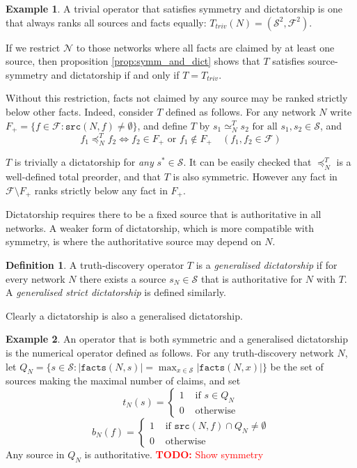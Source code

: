 \documentclass{article}
\theoremstyle{definition} \newtheorem{definition}{Definition}
\theoremstyle{definition} \newtheorem{example}{Example}
\theoremstyle{plain} \newtheorem{axiom}{Axiom}
\theoremstyle{plain} \newtheorem*{remark}{Remark}
\theoremstyle{remark} \newtheorem*{notation}{Notation}
\theoremstyle{plain} \newtheorem{lemma}{Lemma}
\theoremstyle{plain} \newtheorem{theorem}{Theorem}
\theoremstyle{plain} \newtheorem{proposition}{Proposition}
\newcommand{\todo}[1] {
    \textcolor{red}{
        \textbf{TODO:} #1
    }
}
\renewcommand{\S}{\mathcal{S}}  %
\newcommand{\F}{\mathcal{F}}
\newcommand{\N}{\mathcal{N}}
\newcommand{\seq}{\simeq}
\newcommand{\fle}{\preceq}
\newcommand{\src}{\texttt{src}}
\newcommand{\fact}{\texttt{facts}}
\begin{document}
\begin{example}
A trivial operator that satisfies symmetry and dictatorship is one that always
ranks all sources and facts equally: $T_{triv}(N) = (\S^2, \F^2)$.

If we restrict $\N$ to those networks where all facts are claimed by
at least one source, then proposition \ref{prop:symm_and_dict} shows that $T$
satisfies source-symmetry and dictatorship if and only if $T=T_{triv}$.

Without this restriction, facts not claimed by any source may be ranked
strictly below other facts. Indeed, consider $T$ defined as follows. For any
network $N$ write $F_{+} = \{f \in \F : \src(N, f) \ne \emptyset \}$, and
define $T$ by $s_1 \seq_N^{T} s_2 \text{ for all } s_1, s_2 \in \S$, and
$$
    f_1 \fle_N^{T} f_2 \iff f_2 \in F_{+} \text{ or } f_1 \notin F_{+}
    \quad
    (f_1, f_2 \in \F)
$$

$T$ is trivially a dictatorship for \emph{any} $s^* \in \S$. It can be easily
checked that $\fle_N^T$ is a well-defined total preorder, and that $T$ is also
symmetric. However any fact in $\F \setminus F_+$ ranks strictly below any fact
in $F_+$.
\end{example}

Dictatorship requires there to be a fixed source that is authoritative
in all networks. A weaker form of dictatorship, which is more compatible with
symmetry, is where the authoritative source may depend on $N$.

\begin{definition}
\label{def:gen_dict}
A truth-discovery operator $T$ is a \emph{generalised dictatorship} if for
every network $N$ there exists a source $s_N \in \S$ that is authoritative for
$N$ with $T$. A \emph{generalised strict dictatorship} is defined similarly.
\end{definition}

Clearly a dictatorship is also a generalised dictatorship.

\begin{example}
\label{example:symm_and_gen_dict}
An operator that is both symmetric and a generalised dictatorship is the
numerical operator defined as follows. For any truth-discovery network $N$, let
$Q_N = \{s \in \S \colon |\fact(N, s)| = \max_{x \in \S}{|\fact(N, x)|}\}$ be
the set of sources making the maximal number of claims, and set
\[
    t_N(s) = \begin{cases}
        1 & \text{ if } s \in Q_N \\
        0 & \text{ otherwise}
    \end{cases}
\]
\[
    b_N(f) = \begin{cases}
        1 & \text{ if } \src(N, f) \cap Q_N \ne \emptyset \\
        0 & \text{ otherwise}
    \end{cases}
\]
Any source in $Q_N$ is authoritative. \todo{Show symmetry}
\end{example}
\end{document}
